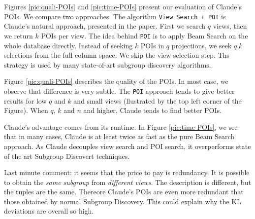 Figures \ref{pic:quali-POIs} and \ref{pic:time-POIs} present our evaluation of
Claude's POIs. We compare two approaches. The algorithm \texttt{View Search +
POI} is Claude's natural approach, presented in the paper. First we search $q$
views, then we return $k$ POIs per view. The idea behind \texttt{POI} is to
apply Beam Search on the whole database directly. Instead of seeking $k$ POIs
in $q$ projections, we seek $q.k$ selections from the full column space.  We
skip the view selection step. Ths strategy is used by many state-of-art
subgroup discovery algorithms. 

Figure \ref{pic:quali-POIs} describes the quality of the POIs. In most case, we
observe that difference is very subtle. The \texttt{POI} approach tends to give
better results for low $q$ and $k$ and small views (llustrated by the top left
corner of the Figure). When $q$, $k$ and $n$ and higher, Claude tends to find
better POIs.

Claude's advantage comes from its runtime. In Figure \ref{pic:time-POIs}, we
see that in many cases, Claude is at least twice as fast as the pure Beam
Search approach. As Claude decouples view search and POI search, it
overperforms state of the art Subgroup Discovert techniques.

Last minute comment: it seems that the price to pay is redundancy. It is
possible to obtain the \emph{same subgroup} from \emph{different views}. The
description is different, but the tuples are the same. Thereore Claude's POIs
are even more redundant that those obtained by normal Subgroup Discovery.  This
could explain why the KL deviations are overall so high.
